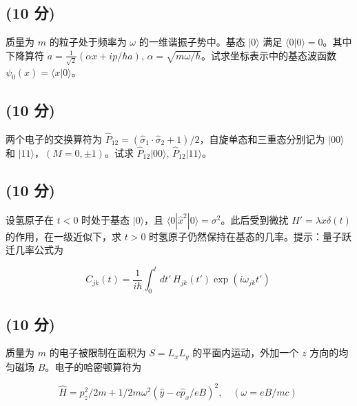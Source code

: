 \subsection{(10 分)}质量为 $m$ 的粒子处于频率为 $\omega$ 的一维谐振子势中。基态 $|0\rangle$ 满足 $\langle 0| 0\rangle = 0$。其中下降算符 $a = \frac{1}{\sqrt{2}} (\alpha x + ip/\hbar a)$, $\alpha = \sqrt{m\omega/\hbar}$。试求坐标表示中的基态波函数 $\psi_0(x) = \langle x| 0\rangle$。

\subsection{(10 分)}两个电子的交换算符为 $\hat{P}_{12} = (\hat{\sigma}_1\cdot \hat{\sigma}_2+1)/2$，自旋单态和三重态分别记为 $|00\rangle$ 和 $|11\rangle$，$(M = 0, \pm1)$。试求 $\hat{P}_{12}|00\rangle$, $\hat{P}_{12}|11\rangle$。

\subsection{(10 分)}设氢原子在 $t<0$ 时处于基态 $|0\rangle$，且 $\langle 0| \hat{x}^2 | 0\rangle = \sigma^2$。此后受到微扰 $H' = \lambda \dot{x} \delta(t)$ 的作用，在一级近似下，求 $t>0$ 时氢原子仍然保持在基态的几率。提示：量子跃迁几率公式为

$$C_{jk}(t) = \frac{1}{i\hbar} \int_0^t dt' \, H_{jk}(t') \exp(i\omega_{jk} t')~$$

\subsection{(10 分)}质量为 $m$ 的电子被限制在面积为 $S=L_x L_y$ 的平面内运动，外加一个 $z$ 方向的均匀磁场 $B$。电子的哈密顿算符为

$$\hat{H} = p_z^2/2m + 1/2m \omega^2\left(\hat{y}-c\hat{p}_x/eB\right)^2, \quad (\omega = eB/mc)~$$
